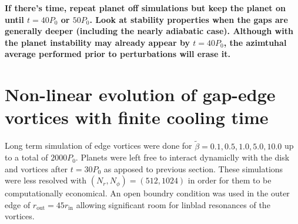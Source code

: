 



{\bf
If there's time, repeat planet off simulations but keep the planet on
until $t=40P_0$ or $50P_0$. Look at stability properties when the gaps
are generally deeper (including the nearly adiabatic case). Although
with the planet instability may already appear by $t=40P_0$, the
azimtuhal average performed prior to perturbations will erase it. 
}



\section{Non-linear evolution of
  gap-edge vortices with finite cooling time} 

Long term simulation of edge vortices were done for
$\tilde{\beta}=0.1,0.5,1.0,5.0,10.0$ up to a total of
$2000P_0$. Planets were left free to interact dynamiclly with the disk
and vortices after $t=30P_0$ as apposed to previous section. These
simulations were less resolved with $(N_r,N_{\phi})=(512,1024)$ in
order for them to be computationally economical. An open boundry
condition was used in the outer edge of
$r_{\mathrm{out}}=45r_{\mathrm{in}}$ allowing significant room for
linblad resonances of the vortices. 

